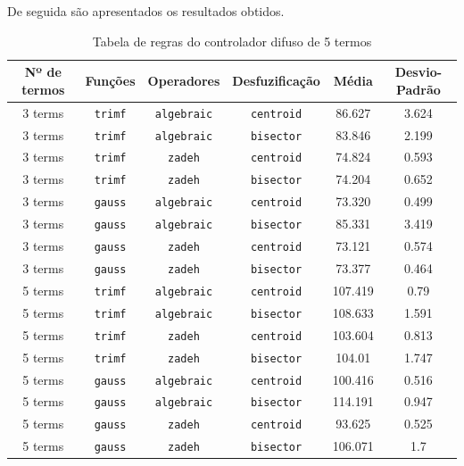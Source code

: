\documentclass{article}
\begin{document}
De seguida são apresentados os resultados obtidos.
\begin{table}[!h]
\centering
	\caption{Tabela de regras do controlador difuso de 5 termos}
	\label{results}
	\begin{tabular}{|c|c|c|c|c|c|}
		\hline 
		\textbf{Nº de termos} & \textbf{Funções} & \textbf{Operadores} & \textbf{Desfuzificação} & \textbf{Média} & \textbf{Desvio-Padrão} \\
		\hline
		3 terms & \texttt{trimf} & \texttt{algebraic} & \texttt{centroid} & 86.627 & 3.624 \\
		\hline
		3 terms & \texttt{trimf} & \texttt{algebraic} & \texttt{bisector} & 83.846 & 2.199 \\
		\hline
		3 terms & \texttt{trimf} & \texttt{zadeh} & \texttt{centroid} & 74.824 & 0.593 \\
		\hline
		3 terms & \texttt{trimf} & \texttt{zadeh} & \texttt{bisector} & 74.204 & 0.652 \\
		\hline
		3 terms & \texttt{gauss} & \texttt{algebraic} & \texttt{centroid} & 73.320 & 0.499 \\
		\hline
		3 terms & \texttt{gauss} & \texttt{algebraic} & \texttt{bisector} & 85.331 & 3.419 \\
		\hline
		3 terms & \texttt{gauss} & \texttt{zadeh} & \texttt{centroid} & 73.121 & 0.574 \\
		\hline
		3 terms & \texttt{gauss} & \texttt{zadeh} & \texttt{bisector} & 73.377 & 0.464 \\
		\hline
		5 terms & \texttt{trimf} & \texttt{algebraic} & \texttt{centroid} & 107.419 & 0.79 \\
		\hline
		5 terms & \texttt{trimf} & \texttt{algebraic} & \texttt{bisector} & 108.633 & 1.591 \\
		\hline
		5 terms & \texttt{trimf} & \texttt{zadeh} & \texttt{centroid} & 103.604 & 0.813 \\
		\hline
		5 terms & \texttt{trimf} & \texttt{zadeh} & \texttt{bisector} & 104.01 & 1.747 \\
		\hline
		5 terms & \texttt{gauss} & \texttt{algebraic} & \texttt{centroid} & 100.416 & 0.516 \\
		\hline
		5 terms & \texttt{gauss} & \texttt{algebraic} & \texttt{bisector} & 114.191 & 0.947 \\
		\hline
		5 terms & \texttt{gauss} & \texttt{zadeh} & \texttt{centroid} & 93.625 & 0.525 \\
		\hline
		5 terms & \texttt{gauss} & \texttt{zadeh} & \texttt{bisector} & 106.071 & 1.7 \\
		\hline
	\end{tabular} 
\end{table}
\end{document}
